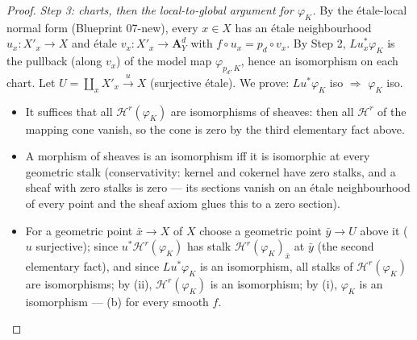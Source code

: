 \documentclass[11pt]{article}
\theoremstyle{plain}
\theoremstyle{definition}
\newcommand{\Aaf}{\mathbf A}
\begin{document}
\begin{proof}
\emph{Step 3: charts, then the local-to-global argument for
$\varphi_K$.}  By the \'etale-local normal form (Blueprint 07-new),
every $x\in X$ has an \'etale neighbourhood $u_x:X'_x\to X$ and
\'etale $v_x:X'_x\to\Aaf^d_Y$ with $f\circ u_x=p_d\circ v_x$.  By
Step 2, $Lu_x^{*}\varphi_K$ is the pullback (along $v_x$) of the
model map $\varphi_{p_d,K}$, hence an isomorphism on each chart.
Let $U=\coprod_xX'_x\xrightarrow{u}X$ (surjective \'etale).  We
prove:  $Lu^{*}\varphi_K$ iso $\Rightarrow$ $\varphi_K$ iso.
\begin{itemize}
\item[(i)] It suffices that all $\mathcal H^r(\varphi_K)$ are
isomorphisms of sheaves:  then all $\mathcal H^r$ of the mapping
cone vanish, so the cone is zero by the third elementary fact
above.
\item[(ii)] A morphism of sheaves is an isomorphism iff it is
isomorphic at every geometric stalk (conservativity:  kernel and
cokernel have zero stalks, and a sheaf with zero stalks is zero ---
its sections vanish on an \'etale neighbourhood of every point and
the sheaf axiom glues this to a zero section).
\item[(iii)] For a geometric point $\bar x\to X$ of $X$ choose a
geometric point $\bar y\to U$ above it ($u$ surjective);  since
$u^{*}\mathcal H^r(\varphi_K)$ has stalk $\mathcal H^r(\varphi_K)_{\bar x}$
at $\bar y$ (the second elementary fact), and since $Lu^{*}\varphi_K$
is an isomorphism, all stalks of $\mathcal H^r(\varphi_K)$ are
isomorphisms;  by (ii), $\mathcal H^r(\varphi_K)$ is an
isomorphism;  by (i), $\varphi_K$ is an isomorphism --- (b) for
every smooth $f$.
\end{itemize}


\end{proof}
\end{document}
